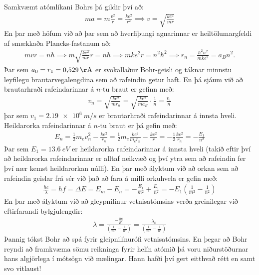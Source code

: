 \ifdefined \wholebook \else\documentclass[oneside]{book}\usepackage{EdlBook}\graphicspath{{figures/}}
\begin{document}
Samkvæmt atómlíkani Bohrs þá gildir því að:
\begin{align*}
    m a = m \frac{v^2}{r} = \frac{ke^2}{r^2} \implies v = \sqrt{\frac{ke^2}{m r}}
\end{align*}
En þar með höfum við að þar sem að hverfiþungi agnarinnar er heiltölumargfeldi af smækkaða Plancks-fastanum að:
\begin{align*}
    mvr = n\hbar \implies m \sqrt{\frac{ke^2}{mr}} r = n \hbar \implies mke^2 r = n^2 \hbar^2 \implies r_n = \frac{\hbar^2 n^2}{mke^2} = a_B n^2.
\end{align*}
Þar sem $a_0 = r_1 = \SI{0.529}{\AA}$ er svokallaður Bohr-geisli og táknar minnstu leyfilegu brautarvegalengdina sem að rafeindin getur haft. En þá sjáum við að brautarhraði rafeindarinnar á $n$-tu braut er gefinn með:
\begin{align*}
    v_n = \sqrt{\frac{ke^2}{mr_n}} = \sqrt{\frac{ke^2}{ma_B}} \cdot \frac{1}{n} = \frac{v_1}{n} 
\end{align*}
þar sem $v_1 = \SI{2.19e6}{m/s}$ er brautarhraði rafeindarinnar á innsta hveli. Heildarorka rafeindarinnar á $n$-tu braut er þá gefin með:
\begin{align*}
    E_n = \frac{1}{2}m_ev_n^2  - \frac{ke^2}{r_n} = \frac{1}{2} m_e \frac{ke^2}{m_e r_n} - \frac{ke^2}{r} = -\frac{1}{2} \frac{ke^2}{r_n} = -\frac{E_1}{n^2}
\end{align*}
Þar sem $E_1 = \SI{13.6}{eV}$ er heildarorka rafeindarinnar á innsta hveli (takið eftir því að heildarorka rafeindarinnar er alltaf neikvæð og því ytra sem að rafeindin fer því nær kemst heildarorkan núlli). En þar með ályktum við að orkan sem að rafeindin geislar frá sér við það að fara á milli orkuhvela er gefin með:
\begin{align*}
    \frac{hc}{\lambda} = hf = \Delta E = E_m - E_n = -\frac{E_1}{m^2} + \frac{E_1}{n^2} = -E_1 \left( \frac{1}{m^2} - \frac{1}{n^2} \right)
\end{align*}
En þar með ályktum við að gleypnilínur vetnisatómsins verða greinilegar við eftirfarandi bylgjulengdir:
\begin{align*}
    \lambda = \frac{-\frac{hc}{E_1}}{\left( \frac{1}{m^2} - \frac{1}{n^2} \right)} = \frac{\lambda_0}{\left( \frac{1}{m^2} - \frac{1}{n^2} \right)}
\end{align*}
Þannig tókst Bohr að spá fyrir gleipnilínurófi vetnisatómsins. En þegar að Bohr reyndi að framkvæma sömu reikninga fyrir helín atómið þá voru niðurstöðurnar hans algjörlega í mótsögn við mælingar. Hann hafði því gert eitthvað rétt en samt svo vitlaust!
\end{document}

